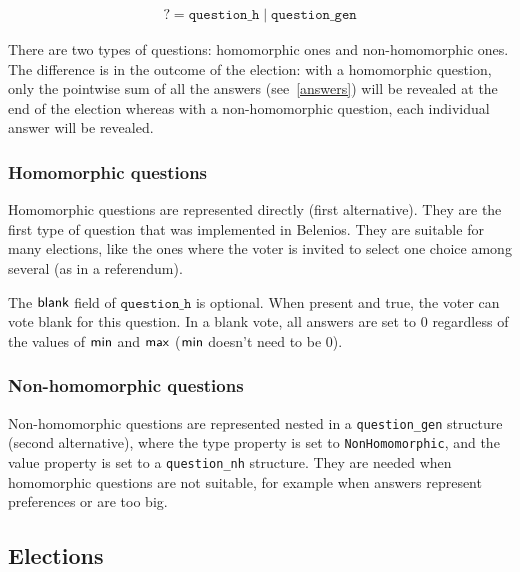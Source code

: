 \documentclass[a4paper]{article}
\begin{document}
\begin{gather*}
  \question=\texttt{question\_h}\mid\texttt{question\_gen}
\end{gather*}

There are two types of questions: homomorphic ones and non-homomorphic
ones. The difference is in the outcome of the election: with a
homomorphic question, only the pointwise sum of all the answers
(see~\ref{answers}) will be revealed at the end of the election
whereas with a non-homomorphic question, each individual answer will
be revealed.

\subsubsection{Homomorphic questions}

Homomorphic questions are represented directly (first
alternative). They are the first type of question that was implemented
in Belenios. They are suitable for many elections, like the ones where
the voter is invited to select one choice among several (as in a
referendum).

The $\textsf{blank}$ field of $\texttt{question\_h}$ is optional. When present
and true, the voter can vote blank for this question. In a blank vote,
all answers are set to $0$ regardless of the values of $\textsf{min}$ and
$\textsf{max}$ ($\textsf{min}$ doesn't need to be $0$).

\subsubsection{Non-homomorphic questions}

Non-homomorphic questions are represented nested in a
\texttt{question\_gen} structure (second alternative), where the
\textsf{type} property is set to \verb=NonHomomorphic=, and the
\textsf{value} property is set to a \texttt{question\_nh}
structure. They are needed when homomorphic questions are not
suitable, for example when answers represent preferences or are too
big.

\subsection{Elections}
\label{elections}

\newcommand{\answer}{\texttt{answer}}
\newcommand{\signature}{\texttt{signature}}
\newcommand{\iproofs}{\textsf{individual\_proofs}}
\newcommand{\oproof}{\textsf{overall\_proof}}
\newcommand{\bproof}{\textsf{blank\_proof}}
\newcommand{\choices}{\textsf{choices}}
\newcommand{\iprove}{\textsf{iprove}}
\end{document}
